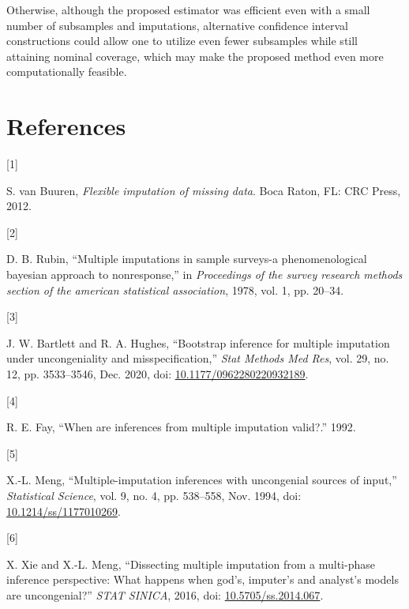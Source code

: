 \documentclass[
  letterpaper,
  DIV=11,
  numbers=noendperiod]{scrreprt}
\newlength{\cslhangindent}
\newlength{\csllabelwidth}
\newlength{\cslentryspacingunit} %
\newenvironment{CSLReferences}[2] %
 {%
  \setlength{\parindent}{0pt}
  \ifodd #1
  \let\oldpar\par
  \def\par{\hangindent=\cslhangindent\oldpar}
  \fi
  \setlength{\parskip}{#2\cslentryspacingunit}
 }%
 {}
\newcommand{\CSLLeftMargin}[1]{\parbox[t]{\csllabelwidth}{#1}}
\newcommand{\CSLRightInline}[1]{\parbox[t]{\linewidth - \csllabelwidth}{#1}\break}
\begin{document}
Otherwise, although the proposed estimator was efficient even with a
small number of subsamples and imputations, alternative confidence
interval constructions could allow one to utilize even fewer subsamples
while still attaining nominal coverage, which may make the proposed
method even more computationally feasible.


\hypertarget{references}{%
\chapter*{References}\label{references}}

\hypertarget{refs}{}
\begin{CSLReferences}{0}{0}
\leavevmode{}%
\CSLLeftMargin{{[}1{]} }%
\CSLRightInline{S. van Buuren, \emph{Flexible imputation of missing
data}. Boca Raton, {FL}: {CRC} Press, 2012.}

\leavevmode{}%
\CSLLeftMargin{{[}2{]} }%
\CSLRightInline{D. B. Rubin, {``Multiple imputations in sample surveys-a
phenomenological bayesian approach to nonresponse,''} in
\emph{Proceedings of the survey research methods section of the american
statistical association}, 1978, vol. 1, pp. 20--34.}

\leavevmode{}%
\CSLLeftMargin{{[}3{]} }%
\CSLRightInline{J. W. Bartlett and R. A. Hughes, {``Bootstrap inference
for multiple imputation under uncongeniality and misspecification,''}
\emph{Stat Methods Med Res}, vol. 29, no. 12, pp. 3533--3546, Dec. 2020,
doi:
\href{https://doi.org/10.1177/0962280220932189}{10.1177/0962280220932189}.}

\leavevmode{}%
\CSLLeftMargin{{[}4{]} }%
\CSLRightInline{R. E. Fay, {``When are inferences from multiple
imputation valid?.''} 1992.}

\leavevmode{}%
\CSLLeftMargin{{[}5{]} }%
\CSLRightInline{X.-L. Meng, {``Multiple-imputation inferences with
uncongenial sources of input,''} \emph{Statistical Science}, vol. 9, no.
4, pp. 538--558, Nov. 1994, doi:
\href{https://doi.org/10.1214/ss/1177010269}{10.1214/ss/1177010269}.}

\leavevmode{}%
\CSLLeftMargin{{[}6{]} }%
\CSLRightInline{X. Xie and X.-L. Meng, {``Dissecting multiple imputation
from a multi-phase inference perspective: What happens when god's,
imputer's and analyst's models are uncongenial?''} \emph{{STAT}
{SINICA}}, 2016, doi:
\href{https://doi.org/10.5705/ss.2014.067}{10.5705/ss.2014.067}.}


\end{CSLReferences}
\end{document}
